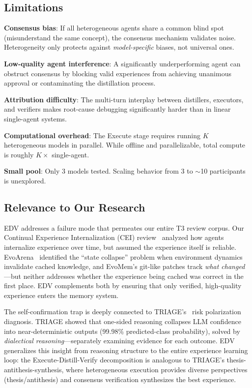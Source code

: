 \documentclass[11pt,a4paper]{article}
\begin{document}
\subsection{Limitations}

\textbf{Consensus bias}: If all heterogeneous agents share a common blind spot (misunderstand the same concept), the consensus mechanism validates noise. Heterogeneity only protects against \emph{model-specific} biases, not universal ones.

\textbf{Low-quality agent interference}: A significantly underperforming agent can obstruct consensus by blocking valid experiences from achieving unanimous approval or contaminating the distillation process.

\textbf{Attribution difficulty}: The multi-turn interplay between distillers, executors, and verifiers makes root-cause debugging significantly harder than in linear single-agent systems.

\textbf{Computational overhead}: The Execute stage requires running $K$ heterogeneous models in parallel. While offline and parallelizable, total compute is roughly $K\times$ single-agent.

\textbf{Small pool}: Only 3 models tested. Scaling behavior from 3 to $\sim$10 participants is unexplored.

\subsection{Relevance to Our Research}

EDV addresses a failure mode that permeates our entire T3 review corpus. Our Continual Experience Internalization (CEI) review~\cite{liu2026continual} analyzed how agents internalize experience over time, but assumed the experience itself is reliable. EvoArena~\cite{xu2026evoarena} identified the ``state collapse'' problem when environment dynamics invalidate cached knowledge, and EvoMem's git-like patches track \emph{what changed}---but neither addresses whether the experience being cached was correct in the first place. EDV complements both by ensuring that only verified, high-quality experience enters the memory system.

The self-confirmation trap is deeply connected to TRIAGE's~\cite{jang2026triage} risk polarization diagnosis. TRIAGE showed that one-sided reasoning collapses LLM confidence into near-deterministic outputs (99.98\% predicted-class probability), solved by \emph{dialectical reasoning}---separately examining evidence for each outcome. EDV generalizes this insight from reasoning structure to the entire experience learning loop: the Execute-Distill-Verify decomposition is analogous to TRIAGE's thesis-antithesis-synthesis, where heterogeneous execution provides diverse perspectives (thesis/antithesis) and consensus verification synthesizes the best experience.
\end{document}
